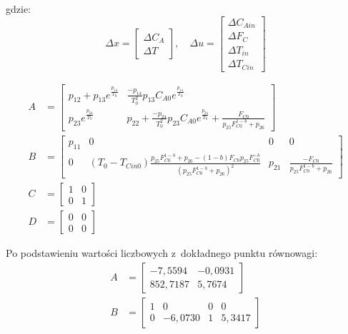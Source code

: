 \documentclass[a4paper,12pt]{article}
\begin{document}
gdzie:
\begin{equation}
    \Delta x = \begin{bmatrix} \Delta C_A\\ \Delta T \end{bmatrix}, \quad
    \Delta u = \begin{bmatrix}\Delta C_{Ain}\\\Delta F_C\\ \Delta T_{in} \\ \Delta T_{Cin} \end{bmatrix}
\end{equation}

\begin{align}
    A &= \begin{bmatrix}
        p_{12}+p_{13}e^{\frac{p_{14}}{T_0}} &  \frac{-p_{14}}{T_0^2}p_{13}C_{A0}e^{\frac{p_{14}}{T_0}}\\[8pt]
        p_{23}e^{\frac{p_{24}}{T_0}} & p_{22}+ \frac{-p_{24}}{T_0^2}p_{23}C_{A0}e^{\frac{p_{24}}{T_0}}+\frac{F_{C0}}{p_{25}F_{C0}^{1-b}+p_{26}}
    \end{bmatrix}\\[10pt]
    B &= \begin{bmatrix}
        p_{11} & 0 & 0 & 0 \\[8pt]
        0 & (T_{0}-T_{Cin0})\frac{p_{25}F_{C0}^{1-b}+p_{26} - (1-b)F_{C0}p_{25}F_{C0}^{-b}}{(p_{25}F_{C0}^{1-b}+p_{26})^2} & p_{21} & \frac{-F_{C0}}{p_{25}F_{C0}^{1-b}+p_{26}}
    \end{bmatrix} \\[10pt]
    C &= \begin{bmatrix}
        1 & 0 \\[8pt]
        0 & 1
    \end{bmatrix} \\[10pt]
        D &= \begin{bmatrix}
        0 & 0 \\[8pt]
        0 & 0
    \end{bmatrix}
\end{align}

Po podstawieniu wartości liczbowych z~dokładnego punktu równowagi:
\begin{align}
    A &= \begin{bmatrix}
        -7{,}5594 & -0{,}0931 \\
        852{,}7187 & 5{,}7674
    \end{bmatrix}\\[10pt]
    B &= \begin{bmatrix}
        1 & 0 & 0 & 0 \\
        0 & -6{,}0730 & 1 & 5{,}3417
    \end{bmatrix}
\end{align}
\end{document}
